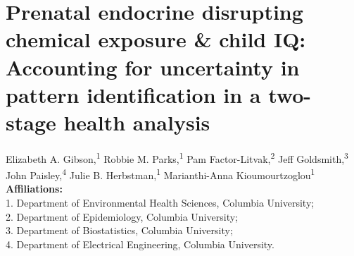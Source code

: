\chapter[Prenatal endocrine disrupting chemical exposure \& child IQ]{Prenatal endocrine disrupting chemical exposure \& child IQ: {\LARGE Accounting for uncertainty in pattern identification in a two-stage health analysis}}\label{sec:ch4}
\vspace{-3em}

\begin{center}
Elizabeth A. Gibson,\textsuperscript{1} 
Robbie M. Parks,\textsuperscript{1}
Pam Factor-Litvak,\textsuperscript{2} 
Jeff Goldsmith,\textsuperscript{3} 
John Paisley,\textsuperscript{4} 
Julie B. Herbstman,\textsuperscript{1} 
Marianthi-Anna Kioumourtzoglou\textsuperscript{1} \\ 

\textbf{Affiliations:} \\ 1. Department of Environmental Health Sciences, Columbia University; \\ 
2. Department of Epidemiology, Columbia University; \\ 
3. Department of Biostatistics, Columbia University; \\ 
4. Department of Electrical Engineering, Columbia University. 
\end{center}

\clearpage


